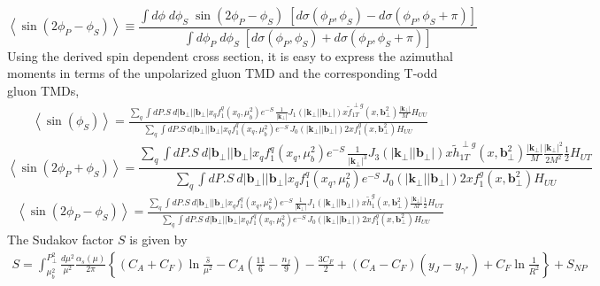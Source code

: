 \documentclass[prd,aps,preprintnumbers,fleqn,showpacs,nofootinbib,superscriptaddress]{revtex4}
\begin{document}
\begin{equation}
\left\langle \sin(2 \phi_P-\phi_S) \right\rangle
 \equiv
\frac{\int d \phi \; d\phi_S \;\sin
(2 \phi_P-\phi_S) \; \left[d \sigma(\phi_P, \phi_S) -
  d \sigma(\phi_P,\phi_S +\pi)\right] }{\int d \phi_P\; d\phi_S\;
\left[d \sigma(\phi_P, \phi_S) + d \sigma(\phi_P,\phi_S +\pi)\right] }
\end{equation}
Using the derived spin dependent cross section, it is easy to express the azimuthal moments in terms of the unpolarized gluon TMD and the corresponding T-odd gluon TMDs,
\begin{eqnarray}
\left\langle \sin(\phi_S)\right\rangle
=\frac{\sum_q  \int dP.S ~d |\bm{b}_\perp| |\bm{b}_\perp| x_q  f_1^q(x_q, \mu_b^2)  e^{-S}\, \frac{1}{|\bm{k}_\perp|}  J_1(|\bm{k}_\perp| |\bm{b}_\perp|) x \tilde{f}_{1T}^{\perp g } (x,\bm{b}_{\perp}^2) \frac{|\bm{k}_\perp|}{M} H_{UU}}{\sum_q  \int dP.S ~d |\bm{b}_\perp| |\bm{b}_\perp| x_q  f_1^q(x_q, \mu_b^2)  e^{-S}\,  J_0(|\bm{k}_\perp| |\bm{b}_\perp|) 2 x f_1^g(x,\bm{b}_{\perp}^2) H_{UU}}
\end{eqnarray}
%
\begin{equation}
\left\langle\sin(2 \phi_P+\phi_S) \right\rangle
=\frac{\sum_q  \int dP.S ~d |\bm{b}_\perp| |\bm{b}_\perp| x_q  f_1^q(x_q, \mu_b^2)  e^{-S} \, \frac{1}{|\bm{k}_\perp|^3}  J_3(|\bm{k}_\perp| |\bm{b}_\perp|) x \tilde{h}_{1T}^{\perp g}(x,\bm{b}_{\perp}^2) \frac{|\bm{k}_\perp|}{M}\frac{|\bm{k}_\perp|^2}{2M^2}  \frac{1}{2}H_{UT}}{\sum_q  \int dP.S ~d |\bm{b}_\perp| |\bm{b}_\perp| x_q  f_1^q(x_q, \mu_b^2)  e^{-S}\,  J_0(|\bm{k}_\perp| |\bm{b}_\perp|) 2 x f_1^g(x,\bm{b}_{\perp}^2) H_{UU}} 
\end{equation}
%
\begin{eqnarray}
\left\langle \sin(2 \phi_P-\phi_S) \right\rangle
=\frac{\sum_q  \int dP.S ~d |\bm{b}_\perp| |\bm{b}_\perp|  x_q  f_1^q(x_q, \mu_b^2)  e^{-S}  \,  \frac{1}{|\bm{k}_\perp|}  J_1(|\bm{k}_\perp| |\bm{b}_\perp|) x \tilde{h}_{1}^{g } (x,\bm{b}_{\perp}^2) \frac{|\bm{k}_\perp|}{M} \frac{1}{2}H_{UT}}{\sum_q  \int dP.S ~d |\bm{b}_\perp| |\bm{b}_\perp| x_q  f_1^q(x_q, \mu_b^2)  e^{-S}\,  J_0(|\bm{k}_\perp| |\bm{b}_\perp|) 2 x f_1^g(x,\bm{b}_{\perp}^2) H_{UU}}
\end{eqnarray}
The  Sudakov factor $S$ is given by~\cite{Hatta:2021jcd}
\begin{eqnarray}
S=\!\int_{\mu_b^2}^{P_\perp^2} \! \frac{d\mu^2}{\mu^2} \frac{\alpha_s(\mu)}{2\pi} \left \{ (C_A+C_F)\ln \frac{\hat s}{\mu^2}- C_A \left (\frac{11}{6}\!-\!\frac{n_f}{9} \right ) -\frac{3C_F}{2}+(C_A\!-\!C_F) (y_J\!-\!y_{\gamma^*})+C_F \ln \frac{1}{R^2} \right \} +S_{NP}
\end{eqnarray}
\end{document}
